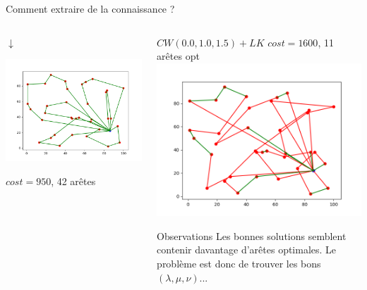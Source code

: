 \documentclass{beamer}
\begin{document}
\begin{frame}{Comment extraire de la connaissance ?}
\begin{columns}[t]
\begin{column}{4cm}
	
	 $\downarrow$
 
 	\includegraphics[scale=0.25]{edgesSol.png}
 
  	$cost = 950$, 42 arêtes 
  \end{column}
  
  \begin{column}{4cm}
  	\centering
  	$CW(0.0,1.0,1.5)+LK$ $cost = 1600$, 11 arêtes opt
	\includegraphics[scale=0.2]{edges010101.png}

	
	\begin{block}{Observations}
	Les bonnes solutions semblent contenir davantage d'arêtes optimales. Le problème est donc de trouver les bons $(\lambda,\mu,\nu)$...
	\end{block}
  \end{column}

 \end{columns}

\end{frame}
\end{document}
